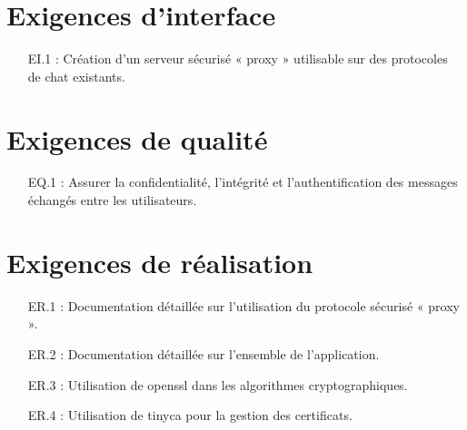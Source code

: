 \documentclass[a4paper,11pt,french]{article}
\begin{document}
\section{Exigences d'interface}
\begin{enumerate}
\item [EI.1] : Création d’un serveur sécurisé « proxy » utilisable sur des protocoles de chat existants.
\end{enumerate}

\section{Exigences de qualité}
\begin{enumerate}
\item [EQ.1] : Assurer la confidentialité, l’intégrité et l’authentification des messages échangés entre les utilisateurs.
\end{enumerate}

\section{Exigences de réalisation}
\begin{enumerate}
\item [ER.1] : Documentation détaillée sur l’utilisation du protocole sécurisé « proxy ».
\item [ER.2] : Documentation détaillée sur l’ensemble de l’application.
\item [ER.3] : Utilisation de openssl dans les algorithmes cryptographiques.
\item [ER.4] : Utilisation de tinyca pour la gestion des certificats.
\end{enumerate}
\end{document}
